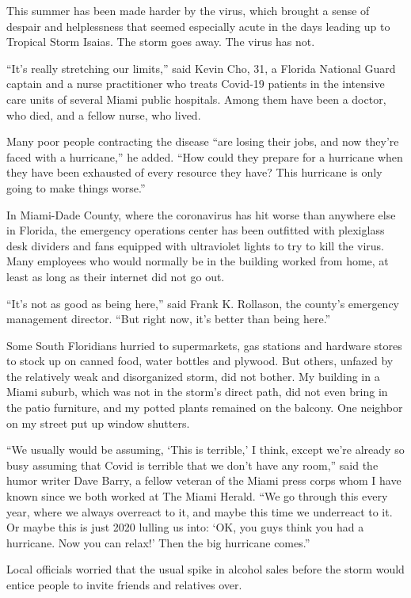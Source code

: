This summer has been made harder by the virus, which brought a sense of
despair and helplessness that seemed especially acute in the days
leading up to Tropical Storm Isaias. The storm goes away. The virus has
not.

``It's really stretching our limits,'' said Kevin Cho, 31, a Florida
National Guard captain and a nurse practitioner who treats Covid-19
patients in the intensive care units of several Miami public hospitals.
Among them have been a doctor, who died, and a fellow nurse, who lived.

Many poor people contracting the disease ``are losing their jobs, and
now they're faced with a hurricane,'' he added. ``How could they prepare
for a hurricane when they have been exhausted of every resource they
have? This hurricane is only going to make things worse.''

In Miami-Dade County, where the coronavirus has hit worse than anywhere
else in Florida, the emergency operations center has been outfitted with
plexiglass desk dividers and fans equipped with ultraviolet lights to
try to kill the virus. Many employees who would normally be in the
building worked from home, at least as long as their internet did not go
out.

``It's not as good as being here,'' said Frank K. Rollason, the county's
emergency management director. ``But right now, it's better than being
here.''

Some South Floridians hurried to supermarkets, gas stations and hardware
stores to stock up on canned food, water bottles and plywood. But
others, unfazed by the relatively weak and disorganized storm, did not
bother. My building in a Miami suburb, which was not in the storm's
direct path, did not even bring in the patio furniture, and my potted
plants remained on the balcony. One neighbor on my street put up window
shutters.

``We usually would be assuming, `This is terrible,' I think, except
we're already so busy assuming that Covid is terrible that we don't have
any room,'' said the humor writer Dave Barry, a fellow veteran of the
Miami press corps whom I have known since we both worked at The Miami
Herald. ``We go through this every year, where we always overreact to
it, and maybe this time we underreact to it. Or maybe this is just 2020
lulling us into: `OK, you guys think you had a hurricane. Now you can
relax!' Then the big hurricane comes.''

Local officials worried that the usual spike in alcohol sales before the
storm would entice people to invite friends and relatives over.

